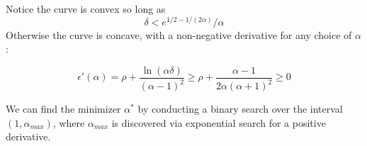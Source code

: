 Notice the curve is convex so long as 
\begin{equation}
    \delta < e^{1/2 - 1/(2\alpha)}/\alpha
\end{equation}
Otherwise the curve is concave, with a non-negative derivative for any choice of $\alpha$: 

\begin{equation}
    \epsilon'(\alpha) = \rho + \frac{\ln(\alpha\delta)}{(\alpha - 1)^2} 
    \geq \rho + \frac{\alpha - 1}{2\alpha (\alpha + 1)^2} 
    \geq 0
\end{equation}

We can find the minimizer $\alpha^{*}$ by conducting a binary search over the interval $(1, \alpha_{max})$, where $\alpha_{max}$ is discovered via exponential search for a positive derivative.








